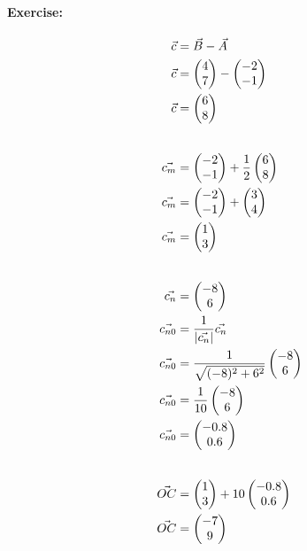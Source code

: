 \paragraph{Exercise:}
\begin{align}
    \vec{c} &= \vec{B} - \vec{A} \\
    \vec{c} &= \B - \A \\
    \vec{c} &= \AB \\[20pt]
    \vec{c_m} &= \A + \frac{1}{2}\AB \\
    \vec{c_m} &= \A  + \ABhalf \\
    \vec{c_m} &= \ABmid \\[20pt]
    \vec{c_n} &= \ABnorm \\
    \vec{c_{n0}} &= \frac{1}{|\vec{c_n}|}\vec{c_n} \\
    \vec{c_{n0}} &= \frac{1}{\ABnrommag}\ABnorm \\
    \vec{c_{n0}} &= \frac{1}{10}\ABnorm \\
    \vec{c_{n0}} &= \ABmidzero \\[20pt]
    \vec{OC} &= \ABmid + \height\ABmidzero \\
    \vec{OC} &= \begin{pmatrix}
        -7 \\ 
        9
    \end{pmatrix}
\end{align}
